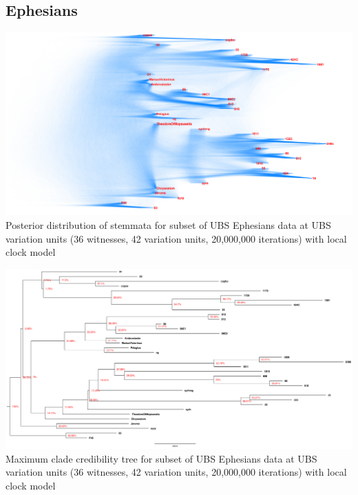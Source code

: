 \documentclass[10pt]{beamer}
\begin{document}
		\subsection{Ephesians}
	\begin{frame}
		\begin{center}
			\includegraphics[width=\textwidth]{../img/ubs_ephesians_local_densitree.pdf}\\
			Posterior distribution of stemmata for subset of UBS Ephesians data at UBS variation units (36 witnesses, 42 variation units, 20,000,000 iterations) with local clock model\\
		\end{center}
	\end{frame}
	\begin{frame}
		\begin{center}
			\includegraphics[width=\textwidth]{../img/ubs_ephesians_local_max_clade_credibility_tree.pdf}\\
			Maximum clade credibility tree for subset of UBS Ephesians data at UBS variation units (36 witnesses, 42 variation units, 20,000,000 iterations) with local clock model\\
		\end{center}
	\end{frame}
\end{document}
